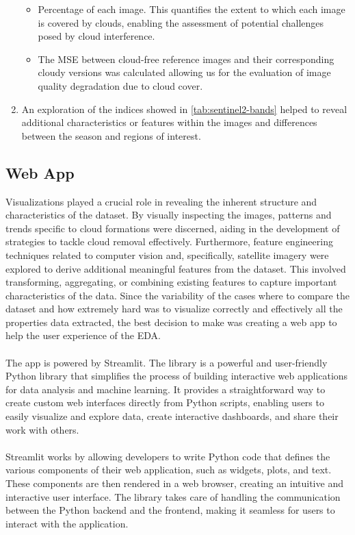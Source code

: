 \documentclass[11pt, a4paper]{article}
\begin{document}
\begin{enumerate}
		\begin{itemize}
			\item Percentage of each image. This quantifies the extent to which each image is covered by clouds, enabling the assessment of potential challenges posed by cloud interference.
			\item The MSE between cloud-free reference images and their corresponding cloudy versions was calculated allowing us for the evaluation of image quality degradation due to cloud cover.
		\end{itemize}
		\item An exploration of the indices showed in \ref{tab:sentinel2-bands} helped to reveal additional characteristics or features within the images and differences between the season and regions of interest.
	\end{enumerate}
	
	\subsection{Web App}
	Visualizations played a crucial role in revealing the inherent structure and characteristics of the dataset. By visually inspecting the images, patterns and trends specific to cloud formations were discerned, aiding in the development of strategies to tackle cloud removal effectively. Furthermore, feature engineering techniques related to computer vision and, specifically, satellite imagery were explored to derive additional meaningful features from the dataset. This involved transforming, aggregating, or combining existing features to capture important characteristics of the data. Since the variability of the cases where to compare the dataset and how extremely hard was to visualize correctly and effectively all the properties data extracted, the best decision to make was creating a web app to help the user experience of the EDA. 
	\\
	\\
	The app is powered by Streamlit. The library is a powerful and user-friendly Python library that simplifies the process of building interactive web applications for data analysis and machine learning. It provides a straightforward way to create custom web interfaces directly from Python scripts, enabling users to easily visualize and explore data, create interactive dashboards, and share their work with others.
	\\\\
	Streamlit works by allowing developers to write Python code that defines the various components of their web application, such as widgets, plots, and text. These components are then rendered in a web browser, creating an intuitive and interactive user interface. The library takes care of handling the communication between the Python backend and the frontend, making it seamless for users to interact with the application.
\end{document}
